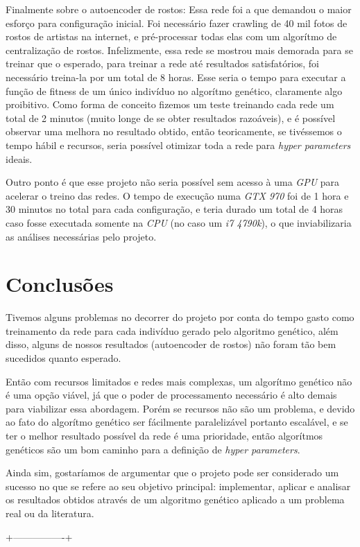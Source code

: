 \documentclass[twoside,conference,a4paper]{IEEEtran}
\begin{document}
Finalmente sobre o autoencoder de rostos: Essa rede foi a que demandou o maior esforço para configuração inicial. Foi necessário fazer crawling de 40 mil fotos de rostos de artistas na internet, e pré-processar todas elas com um algorítmo de centralização de rostos. Infelizmente, essa rede se mostrou mais demorada para se treinar que o esperado, para treinar a rede até resultados satisfatórios, foi necessário treina-la por um total de 8 horas. Esse seria o tempo para executar a função de fitness de um único indivíduo no algorítmo genético, claramente algo proibitivo. Como forma de conceito fizemos um teste treinando cada rede um total de 2 minutos (muito longe de se obter resultados razoáveis), e é possível observar uma melhora no resultado obtido, então teoricamente, se tivéssemos o tempo hábil e recursos, seria possível otimizar toda a rede para \emph{hyper parameters} ideais.


Outro ponto é que esse projeto não seria possível sem acesso à uma \emph{GPU} para acelerar o treino das redes. O tempo de execução numa \emph{GTX 970} foi de 1 hora e 30 minutos no total para cada configuração, e teria durado um total de 4 horas caso fosse executada somente na \emph{CPU} (no caso um \emph{i7 4790k}), o que inviabilizaria as análises necessárias pelo projeto.

\section{Conclusões}

Tivemos alguns problemas no decorrer do projeto por conta do tempo gasto como treinamento da rede para cada indivíduo gerado pelo algoritmo genético, além disso, alguns de nossos resultados (autoencoder de rostos) não foram tão bem sucedidos quanto esperado.

Então com recursos limitados e redes mais complexas, um algorítmo genético não é uma opção viável, já que o poder de processamento necessário é alto demais para viabilizar essa abordagem. Porém se recursos não são um problema, e devido ao fato do algorítmo genético ser fácilmente paralelizável portanto escalável, e se ter o melhor resultado possível da rede é uma prioridade, então algorítmos genéticos são um bom caminho para a definição de \emph{hyper parameters}. 

Ainda sim, gostaríamos de argumentar que o projeto pode ser considerado um sucesso no que se refere ao seu objetivo principal: implementar, aplicar e analisar os resultados obtidos através de um algoritmo genético aplicado a um problema real ou da literatura.


\cite{Rowling:1997}


 +----------------+






\end{document}
